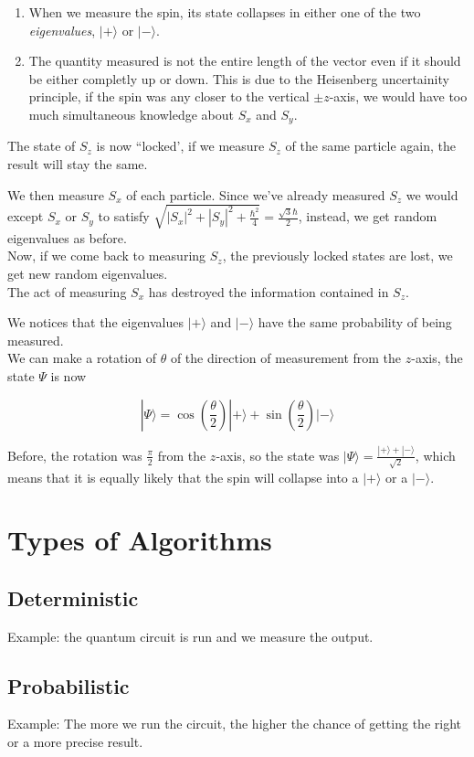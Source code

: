 \documentclass{article}
\begin{document}
\begin{enumerate}
    \item When we measure the spin, its state collapses in either one of the two \textit{eigenvalues}, \(|+\rangle\) or \(|-\rangle\).
    \item The quantity measured is not the entire length of the vector even if it should be either completly up or down.
        This is due to the Heisenberg uncertainity principle, if the spin was any closer to the vertical \(\pm z\)-axis,
        we would have too much simultaneous knowledge about \(S_x\) and \(S_y\).
\end{enumerate}

The state of \(S_z\) is now ``locked', if we measure \(S_z\) of the same particle again, the result will stay the same.

We then measure \(S_x\) of each particle. Since we've already measured \(S_z\) we would except \(S_x\) or \(S_y\)
to satisfy \(\sqrt{{|S_x|}^2 + {|S_y|}^2 + \frac{\hbar^2}{4}} = \frac{\sqrt{3}\hbar}{2}\), instead, we get random eigenvalues as before. \\
Now, if we come back to measuring \(S_z\), the previously locked states are lost, we get new random eigenvalues. \\
The act of measuring \(S_x\) has destroyed the information contained in \(S_z\).

We notices that the eigenvalues \(|+\rangle\) and \(|-\rangle\) have the same probability of being measured. \\
We can make a rotation of \(\theta\) of the direction of measurement from the \(z\)-axis, the state \(\Psi\) is now

\[
    |\Psi\rangle = \cos\left(\frac{\theta}{2}\right) |+\rangle + \sin\left(\frac{\theta}{2}\right)|-\rangle
\]

Before, the rotation was \(\frac{\pi}{2}\) from the \(z\)-axis, so the state was \(|\Psi\rangle=\frac{|+\rangle + |-\rangle}{\sqrt{2}}\),
which means that it is equally likely that the spin will collapse into a \(|+\rangle\) or a \(|-\rangle\).

\pagebreak

\section{Types of Algorithms}

\subsection{Deterministic}

Example: the quantum circuit is run and we measure the output.

\subsection{Probabilistic}

Example: The more we run the circuit, the higher the chance of getting the right or a more precise result.

\end{document}
